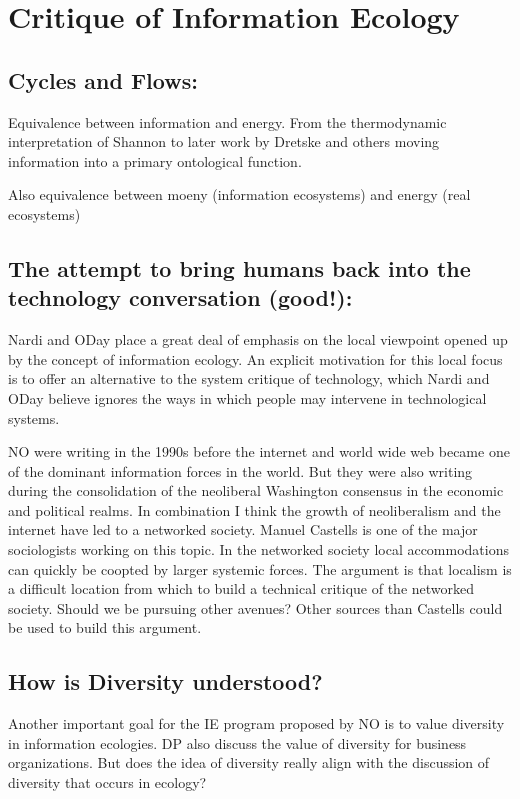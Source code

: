 \section{Critique of Information Ecology}

\subsection{Cycles and Flows:}

Equivalence between information and energy. From the thermodynamic interpretation of Shannon to later work by Dretske and others moving information into a primary ontological function.

Also equivalence between moeny (information ecosystems) and energy (real ecosystems)

\subsection{The attempt to bring humans back into the technology conversation (good!):}

Nardi and ODay place a great deal of emphasis on the local viewpoint opened up by the concept of information ecology. An explicit motivation for this local focus is to offer an alternative to the system critique of technology, which Nardi and ODay believe ignores the ways in which people may intervene in technological systems.

NO were writing in the 1990s before the internet and world wide web became one of the dominant information forces in the world. But they were also writing during the consolidation of the neoliberal Washington consensus in the economic and political realms. In combination I think the growth of neoliberalism and the internet have led to a networked society. Manuel Castells is one of the major sociologists working on this topic. In the networked society local accommodations can quickly be coopted by larger systemic forces. The argument is that localism is a difficult location from which to build a technical critique of the networked society. Should we be pursuing other avenues? Other sources than Castells could be used to build this argument.

\subsection{How is Diversity understood?}

Another important goal for the IE program proposed by NO is to value diversity in information ecologies. DP also discuss the value of diversity for business organizations. But does the idea of diversity really align with the discussion of diversity that occurs in ecology?

